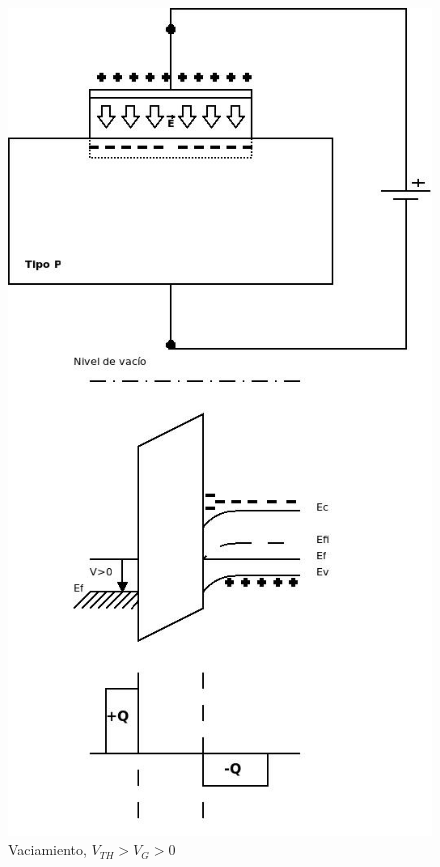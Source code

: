 \documentclass[oneside]{book}
\numberwithin{equation}{section}
\numberwithin{figure}{section}
\numberwithin{table}{section}
\begin{document}
				\begin{minipage}[t]{0.4\textwidth}	
					\begin{figure}[H]
						\begin{center}
							\includegraphics[scale=0.4]{MOS-Dep.jpeg}
							\caption{Vaciamiento, $V_{TH}>V_G>0$}
						\end{center}
					\end{figure}	
				\end{minipage}
\end{document}
